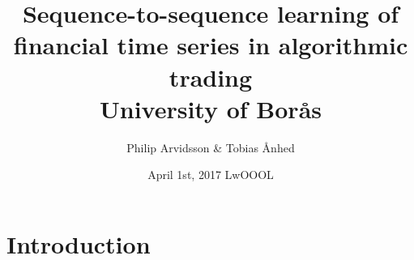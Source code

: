 \documentclass[11pt]{book}
\begin{document}
\title{
  {Sequence-to-sequence learning of financial time series in algorithmic trading}\\
  {\large University of Borås}\\
}

\author{Philip Arvidsson \& Tobias Ånhed}

\date{April 1st, 2017 LwOOOL}

\maketitle


\chapter{Introduction}

\end{document}
